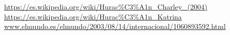 \begin{thebibliography}{9}

  \url{https://es.wikipedia.org/wiki/Hurac%C3%A1n_Charley_(2004)}
  \url{https://es.wikipedia.org/wiki/Hurac%C3%A1n_Katrina}
  \url{www.elmundo.es/elmundo/2003/08/14/internacional/1060893592.html}

\end{thebibliography}